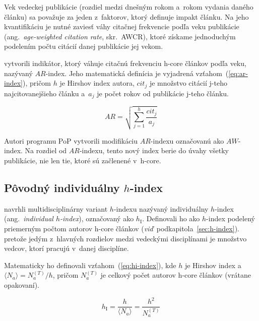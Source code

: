 Vek vedeckej publikácie (rozdiel medzi dnešným rokom a~rokom vydania daného
článku) sa považuje za jeden z~faktorov, ktorý definuje impakt článku.  Na jeho
kvantifikáciu je nutné zaviesť váhy citačnej frekvencie podľa veku publikácie
(ang.~\emph{age-weighted citation rate}, skr.~AWCR), ktoré získame jednoduchým
podelením počtu citácií danej publikácie jej vekom.

\citet{Jin2007} vytvorili indikátor, ktorý váhuje citačnú frekvenciu h-core
článkov podľa veku, nazývaný $\mathit{AR}$-index.  Jeho matematická definícia je
vyjadrená vzťahom~(\ref{eq:ar-index}), pričom $h$ je Hirshov index autora,
$\mathit{cit}_j$ je množstvo citácií j-teho najcitovanejšieho článku a~$a_j$ je
počet rokov od publikácie j-teho článku.

\begin{equation}
\label{eq:ar-index}
\mathit{AR} = \sqrt{\sum_{j=1}^h{\frac{\mathit{cit}_j}{a_j}}}
\end{equation}

Autori programu PoP 
vytvorili modifikáciu $\mathit{AR}$-indexu označovanú ako $\mathit{AW}$-index.
Na rozdiel od $\mathit{AR}$-indexu, tento nový index berie do úvahy všetky
publikácie, nie len tie, ktoré sú začlenené v~h-core.


\subsection{Pôvodný individuálny $h$-index}
\label{sec:hi-index}

\citet{Batista2006} navrhli multidisciplinárny variant $h$-indexu nazývaný
individuálny $h$-index (ang.~\emph{individual $h$-index}), označovaný ako
$h_{\mathrm{I}}$.  Definovali ho ako $h$-index podelený priemerným počtom
autorov h-core článkov
(\emph{viď}~podkapitola~\ref{sec:h-index}).  pretože jedým z~hlavných rozdielov
medzi vedeckými disciplínami je množstvo vedcov, ktorí pracujú v~danej
disciplíne.

Matematicky ho definovali vzťahom~(\ref{eq:hi-index}), kde $h$ je Hirshov index
a $\langle N_a \rangle = N_a^{(T)} / h$, pričom $N_a^{(T)}$ je celkový počet
autorov h-core článkov (vrátane opakovaní).

\begin{equation}
\label{eq:hi-index}
h_{\mathrm{I}} = \frac{h}{\langle N_a \rangle} = \frac{h^2}{N_a^{(T)}}
\end{equation}



